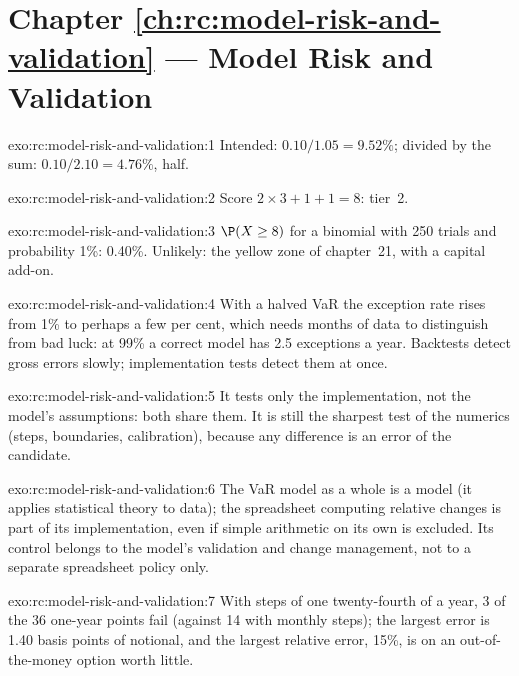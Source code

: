 \section*{Chapter \ref{ch:rc:model-risk-and-validation} --- Model Risk and Validation}

\begin{solution}{exo:rc:model-risk-and-validation:1}
Intended: $0.10/1.05 = 9.52\%$; divided by the sum: $0.10/2.10 = 4.76\%$, half.
\end{solution}

\begin{solution}{exo:rc:model-risk-and-validation:2}
Score $2\times3+1+1 = 8$: tier~2.
\end{solution}

\begin{solution}{exo:rc:model-risk-and-validation:3}
$\P(X\ge8)$ for a binomial with 250 trials and probability 1\%: 0.40\%. Unlikely: the yellow zone of
chapter~21, with a capital add-on.
\end{solution}

\begin{solution}{exo:rc:model-risk-and-validation:4}
With a halved VaR the exception rate rises from 1\% to perhaps a few per cent, which needs months of data
to distinguish from bad luck: at 99\% a correct model has 2.5 exceptions a year. Backtests detect gross
errors slowly; implementation tests detect them at once.
\end{solution}

\begin{solution}{exo:rc:model-risk-and-validation:5}
It tests only the implementation, not the model's assumptions: both share them. It is still the sharpest
test of the numerics (steps, boundaries, calibration), because any difference is an error of the
candidate.
\end{solution}

\begin{solution}{exo:rc:model-risk-and-validation:6}
The VaR model as a whole is a model (it applies statistical theory to data); the spreadsheet computing
relative changes is part of its implementation, even if simple arithmetic on its own is excluded. Its
control belongs to the model's validation and change management, not to a separate spreadsheet
policy only.
\end{solution}

\begin{solution}{exo:rc:model-risk-and-validation:7}
With steps of one twenty-fourth of a year, 3 of the 36 one-year points fail (against 14 with monthly
steps); the largest error is 1.40 basis points of notional, and the largest relative error, 15\%, is on
an out-of-the-money option worth little.
\end{solution}

